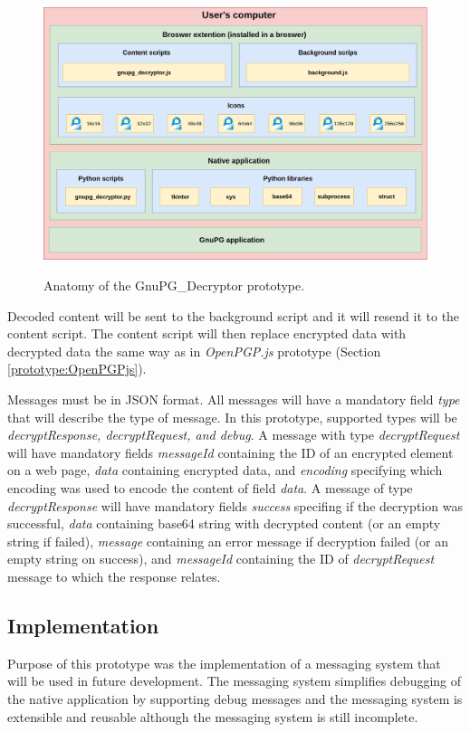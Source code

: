 \begin{figure}[H]
    \begin{center}
        \label{img:gnupg_decryptorAnatomy}
        \includegraphics[width=1.0\textwidth]{obrazky-figures/prototype-GnuPG_Decryptor.png}
        \caption{Anatomy of the GnuPG\_Decryptor prototype.}
    \end{center}
\end{figure}

Decoded content will be sent to the background script and it will resend it to the content script. The content script will then replace encrypted data with decrypted data the same way as in \textit{OpenPGP.js} prototype (Section \ref{prototype:OpenPGPjs}).

Messages must be in JSON format. All messages will have a mandatory field \textit{type} that will describe the type of message. In this prototype, supported types will be \textit{decryptResponse, decryptRequest, and debug}. A message with type \textit{decryptRequest} will have mandatory fields \textit{messageId} containing the ID of an encrypted element on a web page, \textit{data} containing encrypted data, and \textit{encoding} specifying which encoding was used to encode the content of field \textit{data}. A message of type \textit{decryptResponse} will have mandatory fields \textit{success} specifing if the decryption was successful, \textit{data} containing base64 string with decrypted content (or an empty string if failed), \textit{message} containing an error message if decryption failed (or an empty string on success), and \textit{messageId} containing the ID of \textit{decryptRequest} message to which the response relates.

\subsection{Implementation}
Purpose of this prototype was the implementation of a messaging system that will be used in future development. The messaging system simplifies debugging of the native application by supporting debug messages and the messaging system is extensible and reusable although the messaging system is still incomplete.

